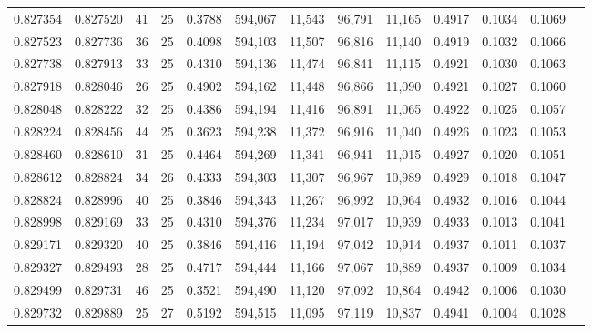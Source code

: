 \begin{tabular}{rrrrrrrrrrrrr}
0.827354 & 0.827520 &    41 &  25 &                                     0.3788 & 594,067 &  11,543 &  96,791 &  11,165 & 0.4917 & 0.1034 & 0.1069 \\
0.827523 & 0.827736 &    36 &  25 &                                     0.4098 & 594,103 &  11,507 &  96,816 &  11,140 & 0.4919 & 0.1032 & 0.1066 \\
0.827738 & 0.827913 &    33 &  25 &                                     0.4310 & 594,136 &  11,474 &  96,841 &  11,115 & 0.4921 & 0.1030 & 0.1063 \\
0.827918 & 0.828046 &    26 &  25 &                                     0.4902 & 594,162 &  11,448 &  96,866 &  11,090 & 0.4921 & 0.1027 & 0.1060 \\
0.828048 & 0.828222 &    32 &  25 &                                     0.4386 & 594,194 &  11,416 &  96,891 &  11,065 & 0.4922 & 0.1025 & 0.1057 \\
0.828224 & 0.828456 &    44 &  25 &                                     0.3623 & 594,238 &  11,372 &  96,916 &  11,040 & 0.4926 & 0.1023 & 0.1053 \\
0.828460 & 0.828610 &    31 &  25 &                                     0.4464 & 594,269 &  11,341 &  96,941 &  11,015 & 0.4927 & 0.1020 & 0.1051 \\
0.828612 & 0.828824 &    34 &  26 &                                     0.4333 & 594,303 &  11,307 &  96,967 &  10,989 & 0.4929 & 0.1018 & 0.1047 \\
0.828824 & 0.828996 &    40 &  25 &                                     0.3846 & 594,343 &  11,267 &  96,992 &  10,964 & 0.4932 & 0.1016 & 0.1044 \\
0.828998 & 0.829169 &    33 &  25 &                                     0.4310 & 594,376 &  11,234 &  97,017 &  10,939 & 0.4933 & 0.1013 & 0.1041 \\
0.829171 & 0.829320 &    40 &  25 &                                     0.3846 & 594,416 &  11,194 &  97,042 &  10,914 & 0.4937 & 0.1011 & 0.1037 \\
0.829327 & 0.829493 &    28 &  25 &                                     0.4717 & 594,444 &  11,166 &  97,067 &  10,889 & 0.4937 & 0.1009 & 0.1034 \\
0.829499 & 0.829731 &    46 &  25 &                                     0.3521 & 594,490 &  11,120 &  97,092 &  10,864 & 0.4942 & 0.1006 & 0.1030 \\
0.829732 & 0.829889 &    25 &  27 &                                     0.5192 & 594,515 &  11,095 &  97,119 &  10,837 & 0.4941 & 0.1004 & 0.1028 \\

\end{tabular}
